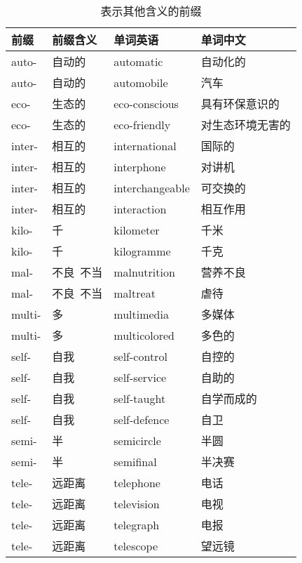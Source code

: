 \documentclass[UTF8]{ctexart}
\begin{document}
    \begin{table}[h!]
        \begin{center}
            \ttfamily
            \begin{tabular}{p{40pt}|p{80pt}|p{90pt}|p{90pt}}
                \hline
                前缀&前缀含义&单词英语&单词中文\\ \hline
                auto-&自动的&automatic&自动化的\\ \hline
                auto-&自动的&automobile&汽车\\ \hline
                eco-&生态的&eco-conscious&具有环保意识的\\ \hline
                eco-&生态的&eco-friendly&对生态环境无害的\\ \hline
                inter-&相互的&international&国际的\\ \hline
                inter-&相互的&interphone&对讲机\\ \hline
                inter-&相互的&interchangeable&可交换的\\ \hline
                inter-&相互的&interaction&相互作用\\ \hline
                kilo-&千&kilometer&千米\\ \hline
                kilo-&千&kilogramme&千克\\ \hline
                mal-&不良~不当&malnutrition&营养不良\\ \hline
                mal-&不良~不当&maltreat&虐待\\ \hline
                multi-&多&multimedia&多媒体\\ \hline
                multi-&多&multicolored&多色的\\ \hline
                self-&自我&self-control&自控的\\ \hline
                self-&自我&self-service&自助的\\ \hline
                self-&自我&self-taught&自学而成的\\ \hline
                self-&自我&self-defence&自卫\\ \hline
                semi-&半&semicircle&半圆\\ \hline
                semi-&半&semifinal&半决赛\\ \hline
                tele-&远距离&telephone&电话\\ \hline
                tele-&远距离&television&电视\\ \hline
                tele-&远距离&telegraph&电报\\ \hline
                tele-&远距离&telescope&望远镜\\ \hline
            \end{tabular}
            \rmfamily
            \caption{表示其他含义的前缀}
        \end{center}
    \end{table}
\end{document}
